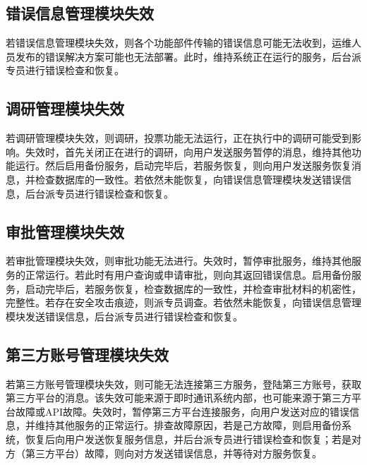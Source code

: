 \subsection{错误信息管理模块失效}
若错误信息管理模块失效，则各个功能部件传输的错误信息可能无法收到，运维人员发布的错误解决方案可能也无法部署。此时，维持系统正在运行的服务，后台派专员进行错误检查和恢复。
{\color{red}
\subsection{\color{red} 调研管理模块失效}
若调研管理模块失效，则调研，投票功能无法运行，正在执行中的调研可能受到影响。失效时，首先关闭正在进行的调研，向用户发送服务暂停的消息，维持其他功能运行。然后启用备份服务，启动完毕后，若服务恢复，则向用户发送服务恢复消息，并检查数据库的一致性。若依然未能恢复，向错误信息管理模块发送错误信息，后台派专员进行错误检查和恢复。
\subsection{\color{red} 审批管理模块失效}
若审批管理模块失效，则审批功能无法进行。失效时，暂停审批服务，维持其他服务的正常运行。若此时有用户查询或申请审批，则向其返回错误信息。启用备份服务，启动完毕后，若服务恢复，检查数据库的一致性，并检查审批材料的机密性，完整性。若存在安全攻击痕迹，则派专员调查。若依然未能恢复，向错误信息管理模块发送错误信息，后台派专员进行错误检查和恢复。
\subsection{\color{red} 第三方账号管理模块失效}
若第三方账号管理模块失效，则可能无法连接第三方服务，登陆第三方账号，获取第三方平台的消息。该失效可能来源于即时通讯系统内部，也可能来源于第三方平台故障或API故障。失效时，暂停第三方平台连接服务，向用户发送对应的错误信息，并维持其他服务的正常运行。排查故障原因，若是己方故障，则启用备份系统，恢复后向用户发送恢复服务信息，并后台派专员进行错误检查和恢复；若是对方（第三方平台）故障，则向对方发送错误信息，并等待对方服务恢复。

}

